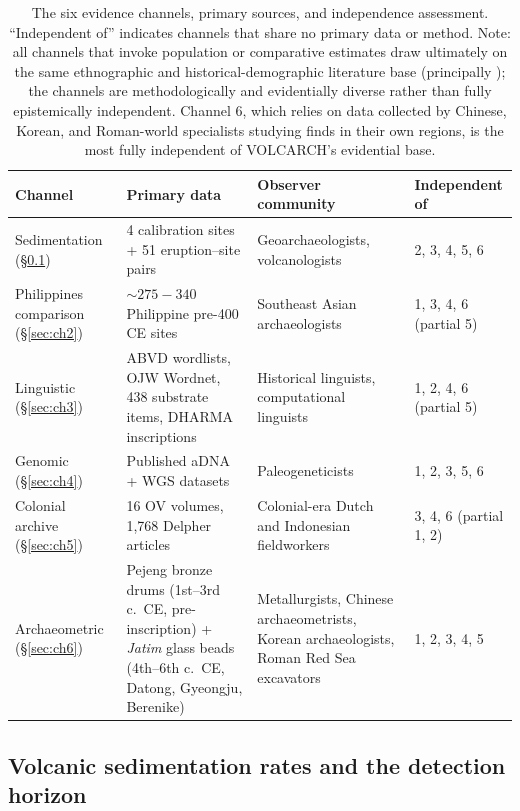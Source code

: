 \documentclass[12pt,a4paper]{article}
\begin{document}
\begin{table}[t]
\caption{The six evidence channels, primary sources, and independence assessment. ``Independent of'' indicates channels that share no primary data or method. Note: all channels that invoke population or comparative estimates draw ultimately on the same ethnographic and historical-demographic literature base (principally \citealp{bellwood2017,reid1988,kirch2000,higham2014}); the channels are methodologically and evidentially diverse rather than fully epistemically independent. Channel 6, which relies on data collected by Chinese, Korean, and Roman-world specialists studying finds in their own regions, is the most fully independent of VOLCARCH's evidential base.}
\label{tab:channels}
\begin{tabular}{p{2.5cm}p{4.5cm}p{4cm}p{3cm}}
\toprule
Channel & Primary data & Observer community & Independent of \\
\midrule
Sedimentation (\S\ref{sec:ch1}) & 4 calibration sites + 51 eruption--site pairs & Geoarchaeologists, volcanologists & 2, 3, 4, 5, 6 \\
Philippines comparison (\S\ref{sec:ch2}) & ${\sim}275{-}340$ Philippine pre-400 CE sites & Southeast Asian archaeologists & 1, 3, 4, 6 (partial 5) \\
Linguistic (\S\ref{sec:ch3}) & ABVD wordlists, OJW Wordnet, 438 substrate items, DHARMA inscriptions & Historical linguists, computational linguists & 1, 2, 4, 6 (partial 5) \\
Genomic (\S\ref{sec:ch4}) & Published aDNA + WGS datasets & Paleogeneticists & 1, 2, 3, 5, 6 \\
Colonial archive (\S\ref{sec:ch5}) & 16 OV volumes, 1{,}768 Delpher articles & Colonial-era Dutch and Indonesian fieldworkers & 3, 4, 6 (partial 1, 2) \\
Archaeometric (\S\ref{sec:ch6}) & Pejeng bronze drums (1st--3rd c.~CE, pre-inscription) + \textit{Jatim} glass beads (4th--6th c.~CE, Datong, Gyeongju, Berenike) & Metallurgists, Chinese archaeometrists, Korean archaeologists, Roman Red Sea excavators & 1, 2, 3, 4, 5 \\
\bottomrule
\end{tabular}
\end{table}

\subsection{Volcanic sedimentation rates and the detection horizon}
\label{sec:ch1}
\end{document}
